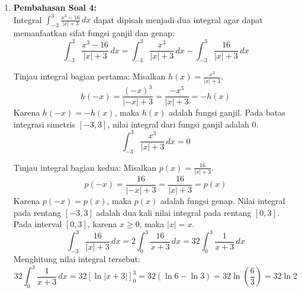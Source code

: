 \documentclass[11pt,openany,a4paper]{article}
\begin{document}
\begin{enumerate}
        Luas daerah gambar $L(x)$ dirumuskan sebagai:
        \[
          L(x) = l_g \cdot t_g = (x - 8) \left( \frac{360}{x} - 12 \right) = 360 - 12x - \frac{2880}{x} + 96 = 456 - 12x - 2880x^{-1}
        \]
        Untuk mencari luas maksimum, cari nilai kritis dengan menggunakan turunan pertama $L'(x)$:
        \[
          L'(x) = -12 + 2880x^{-2} = \frac{2880}{x^2} - 12
        \]
        Untuk menemukan titik stasioner, kita mengatur $L'(x) = 0$:
        \[
          \frac{2880}{x^2} = 12 \implies x^2 = \frac{2880}{12} = 240 \implies x = \sqrt{240} = 4\sqrt{15} \approx 15.49
        \]
        Titik kritis $x \approx 15.49$ berada di luar domain $20 \le x < 30$. \\
        Untuk interval $x \ge 20$, nilai $x^2 \ge 400$, sehingga $\frac{2880}{x^2} \le 7.2$. \\
        Karena itu, $L'(x) = \frac{2880}{x^2} - 12 \le 7.2 - 12 = -4.8 < 0$ untuk setiap $x \in [20, 30)$. \\
        Karena turunan pertamanya negatif ($L'(x) < 0$), fungsi $L(x)$ monoton turun pada interval $20 \le x < 30$. \\
        Karena fungsi monoton turun, nilai maksimum fungsi pada interval dicapai pada batas sekecil-kecilnya dari interval, yaitu di $x = 20$. \\
        Saat $x = 20$, luas daerah gambar maksimum adalah:
        \[
          L(20) = 456 - 12(20) - \frac{2880}{20} = 456 - 240 - 144 = 72 \text{ cm}^2
        \]
        Jadi, luas daerah gambar agar luasnya maksimum adalah $72 \text{ cm}^2$.

  \item \textbf{Pembahasan Soal 4:} \\
        Integral $\int_{-3}^{3} \frac{x^3 - 16}{|x| + 3} \, dx$ dapat dipisah menjadi dua integral agar dapat memanfaatkan sifat fungsi ganjil dan genap:
        \[
          \int_{-3}^{3} \frac{x^3 - 16}{|x| + 3} \, dx = \int_{-3}^{3} \frac{x^3}{|x| + 3} \, dx - \int_{-3}^{3} \frac{16}{|x| + 3} \, dx
        \]

        Tinjau integral bagian pertama:
        Misalkan $h(x) = \frac{x^3}{|x| + 3}$.
        \[
          h(-x) = \frac{(-x)^3}{|-x| + 3} = \frac{-x^3}{|x| + 3} = -h(x)
        \]
        Karena $h(-x) = -h(x)$, maka $h(x)$ adalah fungsi ganjil. Pada batas integrasi simetris $[-3, 3]$, nilai integral dari fungsi ganjil adalah $0$.
        \[
          \int_{-3}^{3} \frac{x^3}{|x| + 3} \, dx = 0
        \]

        Tinjau integral bagian kedua:
        Misalkan $p(x) = \frac{16}{|x| + 3}$.
        \[
          p(-x) = \frac{16}{|-x| + 3} = \frac{16}{|x| + 3} = p(x)
        \]
        Karena $p(-x) = p(x)$, maka $p(x)$ adalah fungsi genap. Nilai integral pada rentang $[-3, 3]$ adalah dua kali nilai integral pada rentang $[0, 3]$. Pada interval $[0, 3]$, karena $x \ge 0$, maka $|x| = x$.
        \[
          \int_{-3}^{3} \frac{16}{|x| + 3} \, dx = 2 \int_{0}^{3} \frac{16}{x + 3} \, dx = 32 \int_{0}^{3} \frac{1}{x + 3} \, dx
        \]
        Menghitung nilai integral tersebut:
        \[
          32 \int_{0}^{3} \frac{1}{x + 3} \, dx = 32 \left[ \ln|x + 3| \right]_{0}^{3} = 32 (\ln 6 - \ln 3) = 32 \ln \left(\frac{6}{3}\right) = 32 \ln 2
        \]


\end{enumerate}
\end{document}
